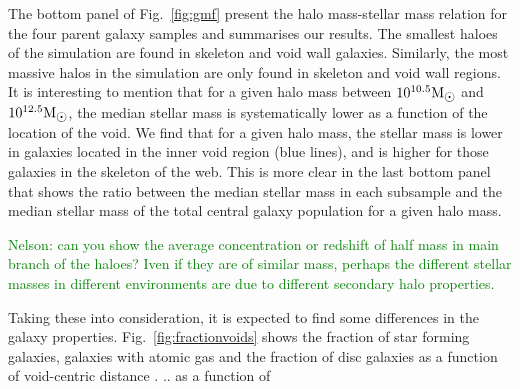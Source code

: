 \documentclass[a4paper,fleqn,usenatbib,letter]{mnras}
\newcommand{\Msun}{\rm M_{\sun}}
\begin{document}
The bottom panel of Fig.~\ref{fig:gmf} present the halo mass-stellar mass relation for the four parent galaxy samples and summarises our results. The smallest haloes of the simulation are found in skeleton and void wall galaxies. Similarly, the most massive halos in the simulation  are only found in skeleton and void wall regions. It is interesting to mention that for a given halo mass between $10^{10.5}\Msun$ and $10^{12.5}\Msun$, the median stellar mass is systematically lower as a function of the location of the void. We find that for a given halo mass, the stellar mass is lower in galaxies located  in the inner void region (blue lines), and  is higher for those galaxies in the skeleton of the web. This is more clear in the last bottom panel that shows the  ratio between the median stellar mass in each subsample and the median stellar mass of the total central galaxy population for a given halo mass.   





\textcolor{green}{Nelson: can you show the average concentration or redshift of half mass in main branch of the haloes?  Iven if they are of similar mass, perhaps the different stellar masses in different environments are due to different secondary halo properties.}

Taking these  into consideration, it is expected to find some differences in the galaxy properties. Fig.~\ref{fig:fractionvoids} shows the fraction of star forming galaxies,  galaxies with atomic gas and  the fraction of disc galaxies as a function of void-centric distance . .. 
as a function of 
\end{document}
